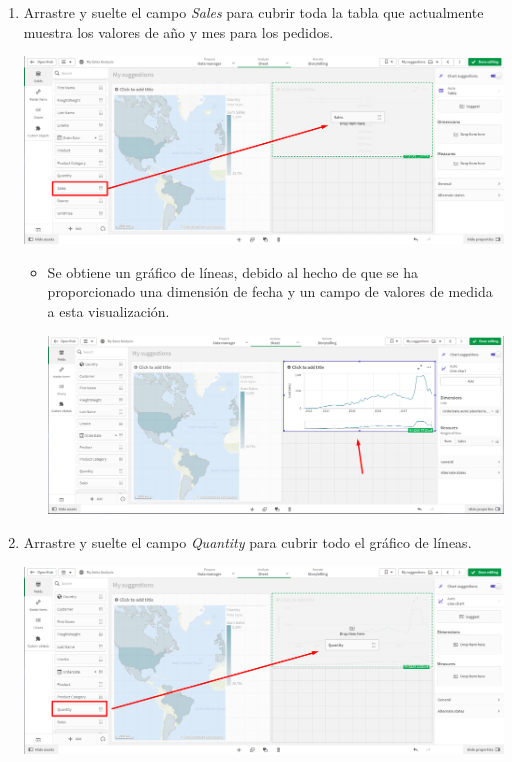 \documentclass[12pt,letterpaper]{article}
\newcommand\tab[1][1cm]{\hspace*{#1}}
\begin{document}
\begin{enumerate}[\tab 1.]
\begin{itemize}
\begin{center}
            \end{center}
        \end{itemize}
        \item Arrastre y suelte el campo \textit{Sales} para cubrir toda la tabla que actualmente muestra los valores de año y mes para los pedidos.
        \begin{center}
            \includegraphics[width=13cm]{./img/img20.png}
        \end{center}
        \begin{itemize}
            \item Se obtiene un gráfico de líneas, debido al hecho de que se ha proporcionado una dimensión de fecha y un campo de valores de medida a esta visualización.
            \begin{center}
                \includegraphics[width=13cm]{./img/img21.png}
            \end{center}
        \end{itemize}
        \item Arrastre y suelte el campo \textit{Quantity} para cubrir todo el gráfico de líneas.
        \begin{center}
            \includegraphics[width=13cm]{./img/img22.png}

\end{center}
\end{enumerate}
\end{document}
